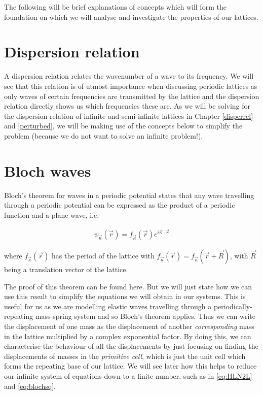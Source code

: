 The following will be brief explanations of concepts which will form the
foundation on which we will analyse and investigate the properties of our
lattices.

\section{Dispersion relation}
\label{disperbg}
A dispersion relation relates the wavenumber of a wave to its frequency. We
will see that this relation is of utmost importance when discussing periodic
lattices as only waves of certain frequencies are transmitted by the lattice
and the dispersion relation directly shows us which frequencies these are. As
we will be solving for the dispersion relation of infinite and semi-infinite
lattices in Chapter \ref{disperrel} and \ref{perturbed}, we will be making use
of the concepts below to simplify the problem (because we do not want to solve
an infinite problem!).

\section{Bloch waves}
\label{blochbg}
Bloch's theorem for waves in a periodic potential\cite{bloch} states that any
wave travelling through a periodic potential can be expressed as the product of
a periodic function and a plane wave,\cite{kittel} i.e.

\begin{align}
  \psi_{\vec{\kappa}}(\vec{r})=f_{\vec{\kappa}}(\vec{r})e^{i\vec{\kappa}\cdot\vec{r}}
\label{eq:blochwave}
\end{align}

where $f_{\vec{\kappa}}(\vec{r})$ has the period of the lattice with
$f_{\vec{\kappa}}(\vec{r})=f_{\vec{\kappa}}(\vec{r}+\vec{R})$, with $\vec{R}$ being a
translation vector of the lattice.

The proof of this theorem can be found here.\cite{kittel} But we will just
state how we can use this result to simplify the equations we will obtain in
our systems. This is useful for us as we are modelling elastic waves travelling
through a periodically-repeating mass-spring system and so Bloch's theorem
applies. Thus we can write the displacement of one mass as the displacement of
another \textit{corresponding} mass in the lattice multiplied by a complex
exponential factor. By doing this, we can characterise the behaviour of all the
displacements by just focusing on finding the displacements of masses in the
\textit{primitive cell}, which is just the unit cell which forms the repeating
base of our lattice. We will see later how this helps to reduce our infinite
system of equations down to a finite number, such as in \eqref{eq:HLN2L} and
\eqref{eq:blochsq}.

